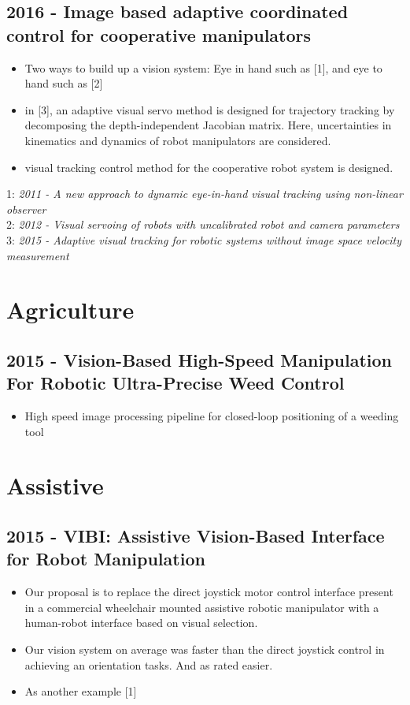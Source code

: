 \subsection{2016 - Image based adaptive coordinated control for cooperative manipulators}
\begin{itemize}
\item Two ways to build up a vision system: Eye in hand such as [1], and eye to hand such as [2]
\item in [3], an adaptive visual servo method is designed for trajectory tracking by decomposing the depth-independent Jacobian matrix. Here, uncertainties in kinematics and dynamics of robot manipulators are considered. 
\item visual tracking control method for the cooperative robot system is designed. 
\end{itemize}
1: \textit{2011 - A new approach to dynamic eye-in-hand visual tracking using non-linear observer} \\
2: \textit{2012 - Visual servoing of robots with uncalibrated robot and camera parameters} \\
3: \textit{2015 - Adaptive visual tracking for robotic systems without image space velocity measurement}

\section{Agriculture}
\subsection{2015 - Vision-Based High-Speed Manipulation For Robotic Ultra-Precise Weed Control}
\begin{itemize}
\item High speed image processing pipeline for closed-loop positioning of a weeding tool
\end{itemize}


\section{Assistive}
\subsection{2015 - VIBI: Assistive Vision-Based Interface for Robot Manipulation}
\begin{itemize}
\item Our proposal is to replace the direct joystick motor control interface present in a commercial wheelchair mounted assistive robotic manipulator with a human-robot interface based on visual selection.
\item  Our vision system on average was faster
than the direct joystick control in achieving an orientation
tasks. And as rated  easier. 
\item As another example [1]
\end{itemize}

